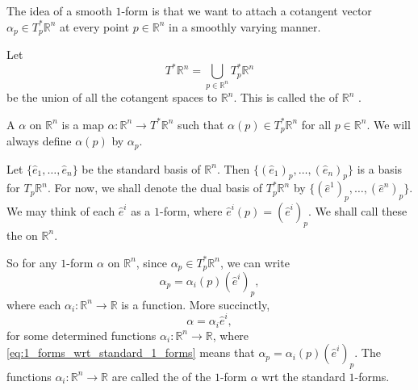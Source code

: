 \documentclass[notoc,notitlepage]{tufte-book}
\begin{document}
\begin{remark}
  The idea of a smooth $1$-form is that we want to attach a cotangent vector $\alpha_p \in
  T_p^* \mathbb{R}^n$ at every point $p \in \mathbb{R}^n$ in a smoothly varying manner.
\end{remark}

Let
\begin{equation*}
  T^* \mathbb{R}^n = \bigcup_{p \in \mathbb{R}^n} T_p^* \mathbb{R}^n
\end{equation*}
be the union of all the cotangent spaces to $\mathbb{R}^n$. This is called the  of $\mathbb{R}^n$ .

\begin{defn}\label{defn:_1_form_on_the_cotangent_bundle}
  A  $\alpha$ on $\mathbb{R}^n$ is a map $\alpha : \mathbb{R}^n \to
  T^* \mathbb{R}^n$ such that $\alpha(p) \in T_p^* \mathbb{R}^n$ for all $p \in \mathbb{R}^n$.
  We will always define $\alpha(p)$ by $\alpha_p$.
\end{defn}

Let $\{ \hat{e}_1, \ldots, \hat{e}_n \}$ be the standard basis of $\mathbb{R}^n$. Then $\{
(\hat{e}_1)_p, \ldots, (\hat{e}_n)_p \}$ is a basis for $T_p \mathbb{R}^n$. For now, we shall
denote the dual basis of $T_p^* \mathbb{R}^n$ by $\{ (\hat{e}^1)_p, \ldots, (\hat{e}^n)_p \}$.
We may think of each $\hat{e}^i$ as a $1$-form, where $\hat{e}^i (p) = (\hat{e}^i)_p$. We shall
call these the  on $\mathbb{R}^n$.

So for any $1$-form $\alpha$ on $\mathbb{R}^n$, since $\alpha_p \in T_p^* \mathbb{R}^n$, we can
write
\begin{equation*}
  \alpha_p = \alpha_i (p) (\hat{e}^i)_p,
\end{equation*}
where each $\alpha_i : \mathbb{R}^n \to \mathbb{R}$ is a function. More succinctly,
\begin{equation}\label{eq:1_forms_wrt_standard_1_forms}
  \alpha = \alpha_i \hat{e}^i,
\end{equation}
for some  determined functions $\alpha_i : \mathbb{R}^n \to \mathbb{R}$, where
\cref{eq:1_forms_wrt_standard_1_forms} means that $\alpha_p = \alpha_i(p)(\hat{e}^i)_p$. The
functions $\alpha_i : \mathbb{R}^n \to \mathbb{R}$ are called the  of
the $1$-form $\alpha$ wrt the standard $1$-forms.
\end{document}
